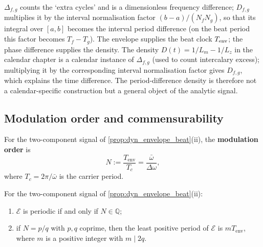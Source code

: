\begin{remark}
\label{rem:dyn_two_densities}
\(\Delta_{f,g}\) counts the `extra cycles' and is a dimensionless frequency difference; \(D_{f,g}\) multiplies it by the interval normalisation factor \((b-a)/(N_fN_g)\), so that its integral over \([a,b]\) becomes the interval period difference (on the beat period this factor becomes \(T_f-T_g\)). The envelope supplies the beat clock \(T_{\rm env}\); the phase difference supplies the density. The density \(D(t)=1/L_m-1/L_z\) in the calendar chapter is a calendar instance of \(\Delta_{f,g}\) (used to count intercalary excess); multiplying it by the corresponding interval normalisation factor gives \(D_{f,g}\), which explains the time difference. The period-difference density is therefore not a calendar-specific construction but a general object of the analytic signal.
\end{remark}

\subsection{Modulation order and commensurability}

\begin{definition}\label{def:dyn_modulation_order}
For the two-component signal of \cref{prop:dyn_envelope_beat}(ii), the \textbf{modulation order} is
\[
N:=\frac{T_{\text{env}}}{T_c}=\frac{\bar\omega}{\Delta\omega},
\]
where $T_c=2\pi/\bar\omega$ is the carrier period.
\end{definition}

\begin{proposition}\label{prop:dyn_modulation_order}
For the two-component signal of \cref{prop:dyn_envelope_beat}(ii):
\begin{enumerate}[label=(\roman*)]
    \item $\mathcal E$ is periodic if and only if $N\in\mathbb Q$;
    \item if $N=p/q$ with $p,q$ coprime, then the least positive period of $\mathcal E$ is $mT_{\text{env}}$, where $m$ is a positive integer with $m\mid 2q$.
\end{enumerate}
\end{proposition}

